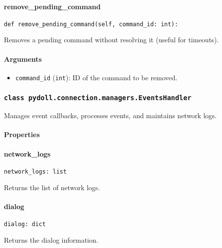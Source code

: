 \documentclass{article}
\begin{document}
\paragraph{remove\_pending\_command}

\begin{lstlisting}[style=pythonstyle]
def remove_pending_command(self, command_id: int):
\end{lstlisting}

\noindent Removes a pending command without resolving it (useful for timeouts).

\paragraph{Arguments}

\begin{itemize}
    \item \lstinline[style=pythonstyle]|command_id| (\lstinline[style=pythonstyle]|int|): ID of the command to be removed.
\end{itemize}

\subsubsection*{\texttt{class pydoll.connection.managers.EventsHandler}}
\noindent Manages event callbacks, processes events, and maintains network logs.

\paragraph{Properties}
\paragraph{network\_logs}

\begin{lstlisting}[style=pythonstyle]
network_logs: list
\end{lstlisting}

\noindent Returns the list of network logs.

\paragraph{dialog}

\begin{lstlisting}[style=pythonstyle]
dialog: dict
\end{lstlisting}

\noindent Returns the dialog information.
\end{document}
